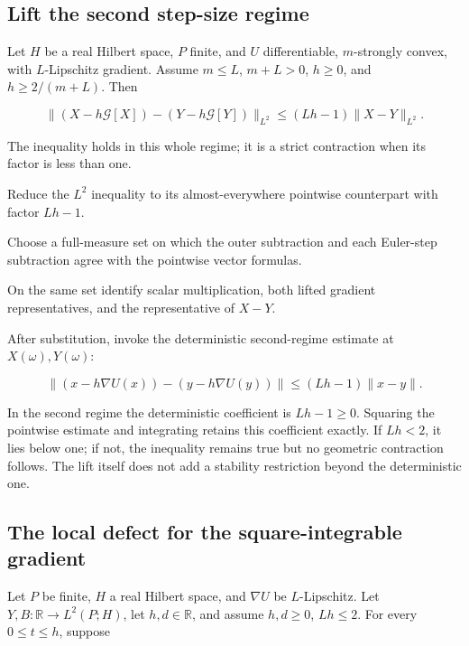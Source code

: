 \documentclass[11pt,a4paper]{article}
\begin{document}
\subsection{\texorpdfstring{Lift the second step-size regime}{Lift the second step-size regime}}


Let \(H\) be a real Hilbert space, \(P\) finite, and \(U\) differentiable, \(m\)-strongly convex, with \(L\)-Lipschitz gradient. Assume \(m\le L\), \(m+L>0\), \(h\ge0\), and \(h\ge2/(m+L)\). Then

\[\|(X-h\mathcal G[X])-(Y-h\mathcal G[Y])\|_{L^2}\le(Lh-1)\|X-Y\|_{L^2}.\]

The inequality holds in this whole regime; it is a strict contraction when its factor is less than one.



Reduce the \(L^2\) inequality to its almost-everywhere pointwise counterpart with factor \(Lh-1\).



Choose a full-measure set on which the outer subtraction and each Euler-step subtraction agree with the pointwise vector formulas.



On the same set identify scalar multiplication, both lifted gradient representatives, and the representative of \(X-Y\).



After substitution, invoke the deterministic second-regime estimate at \(X(\omega),Y(\omega)\):

\[\|(x-h\nabla U(x))-(y-h\nabla U(y))\|\le(Lh-1)\|x-y\|.\]

In the second regime the deterministic coefficient is \(Lh-1\ge0\). Squaring the pointwise estimate and integrating retains this coefficient exactly. If \(Lh<2\), it lies below one; if not, the inequality remains true but no geometric contraction follows. The lift itself does not add a stability restriction beyond the deterministic one.


\subsection{\texorpdfstring{The local defect for the square-integrable gradient}{The local defect for the square-integrable gradient}}


Let \(P\) be finite, \(H\) a real Hilbert space, and \(\nabla U\) be \(L\)-Lipschitz. Let \(Y,B:\mathbb R\to L^2(P;H)\), let \(h,d\in\mathbb R\), and assume \(h,d\ge0\), \(Lh\le2\). For every \(0\le t\le h\), suppose
\end{document}
